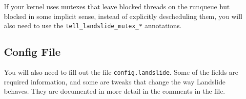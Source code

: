\documentclass{article}
\begin{document}
If your kernel uses mutexes that leave blocked threads on the runqueue but blocked in some implicit sense, instead of explicitly descheduling them, you will also need to use the \texttt{tell\_landslide\_mutex\_*} annotations.


\subsection{Config File}
\label{sec:config}

You will also need to fill out the file \texttt{config.landslide}. Some of the fields are required information, and some are tweaks that change the way Landslide behaves. They are documented in more detail in the comments in the file.
\end{document}
